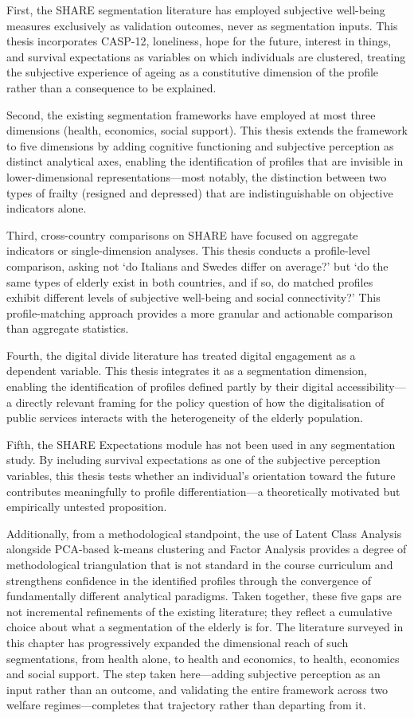 First, the SHARE segmentation literature has employed subjective well-being measures exclusively as validation outcomes, never as segmentation inputs. This thesis incorporates CASP-12, loneliness, hope for the future, interest in things, and survival expectations as variables on which individuals are clustered, treating the subjective experience of ageing as a constitutive dimension of the profile rather than a consequence to be explained.

Second, the existing segmentation frameworks have employed at most three dimensions (health, economics, social support). This thesis extends the framework to five dimensions by adding cognitive functioning and subjective perception as distinct analytical axes, enabling the identification of profiles that are invisible in lower-dimensional representations---most notably, the distinction between two types of frailty (resigned and depressed) that are indistinguishable on objective indicators alone.

Third, cross-country comparisons on SHARE have focused on aggregate indicators or single-dimension analyses. This thesis conducts a profile-level comparison, asking not `do Italians and Swedes differ on average?' but `do the same types of elderly exist in both countries, and if so, do matched profiles exhibit different levels of subjective well-being and social connectivity?' This profile-matching approach provides a more granular and actionable comparison than aggregate statistics.

Fourth, the digital divide literature has treated digital engagement as a dependent variable. This thesis integrates it as a segmentation dimension, enabling the identification of profiles defined partly by their digital accessibility---a directly relevant framing for the policy question of how the digitalisation of public services interacts with the heterogeneity of the elderly population.

Fifth, the SHARE Expectations module has not been used in any segmentation study. By including survival expectations as one of the subjective perception variables, this thesis tests whether an individual's orientation toward the future contributes meaningfully to profile differentiation---a theoretically motivated but empirically untested proposition.

Additionally, from a methodological standpoint, the use of Latent Class Analysis alongside PCA-based k-means clustering and Factor Analysis provides a degree of methodological triangulation that is not standard in the course curriculum and strengthens confidence in the identified profiles through the convergence of fundamentally different analytical paradigms. Taken together, these five gaps are not incremental refinements of the existing literature; they reflect a cumulative choice about what a segmentation of the elderly is for. The literature surveyed in this chapter has progressively expanded the dimensional reach of such segmentations, from health alone, to health and economics, to health, economics and social support. The step taken here---adding subjective perception as an input rather than an outcome, and validating the entire framework across two welfare regimes---completes that trajectory rather than departing from it.
